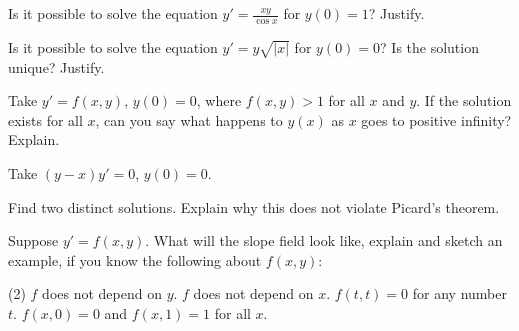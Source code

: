 \begin{exercise}
Is it possible to solve the equation $y' = \frac{xy}{\cos x}$ for $y(0) = 1$?
Justify.
\end{exercise}

\begin{exercise}
Is it possible to solve the equation $y' = y\sqrt{\lvert x\rvert}$ for
$y(0) = 0$?  Is the solution unique?
Justify.
\end{exercise}


\begin{exercise}[challenging]
Take $y' = f(x,y)$, $y(0) = 0$, where $f(x,y) > 1$
for all $x$ and $y$.  If
the solution exists for all $x$, can you say
what happens to $y(x)$ as $x$ goes to positive infinity?  Explain.
\end{exercise}

\begin{exercise}[challenging]
Take $(y-x)y' = 0$, $y(0) = 0$.
\begin{tasks}
\task Find two distinct solutions.
\task Explain why this does not violate Picard's theorem.  
\end{tasks}
\end{exercise}

\begin{exercise}
Suppose $y' = f(x,y)$.  What will the slope field look like, explain and
sketch an example, if you know the following about $f(x,y)$:
\begin{tasks}(2)
\task $f$ does
not depend on $y$.
\task $f$ does not depend on $x$.
\task $f(t,t) = 0$ for any
number $t$.
\task $f(x,0) = 0$ and $f(x,1) = 1$ for all $x$.
\end{tasks}
\end{exercise}

